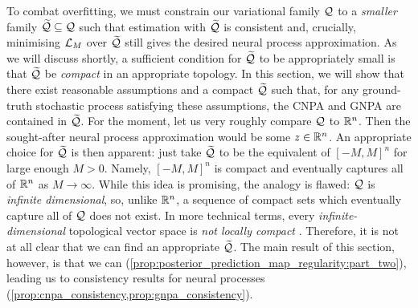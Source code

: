 \documentclass[12pt, twoside]{report}
\begin{document}
To combat overfitting, we must constrain our variational family $\mathcal{Q}$ to a \emph{smaller} family $\widetilde{\mathcal{Q}} \subseteq \mathcal{Q}$ such that estimation with $\widetilde{\mathcal{Q}}$ is consistent and, crucially, minimising $\mathcal{L}_M$ over $\widetilde{\mathcal{Q}}$ still gives the desired neural process approximation.
As we will discuss shortly, a sufficient condition for $\widetilde{\mathcal{Q}}$ to be appropriately small is that $\widetilde{\mathcal{Q}}$ be \emph{compact} in an appropriate topology.
In this section, we will show that there exist reasonable assumptions and a compact $\widetilde{\mathcal{Q}}$ such that, for any ground-truth stochastic process satisfying these assumptions, the CNPA and GNPA are contained in $\widetilde{\mathcal{Q}}$.
For the moment, let us very roughly compare $\mathcal{Q}$ to $\mathbb{R}^n$. 
Then the sought-after neural process approximation would be some $z \in \mathbb{R}^n$.
An appropriate choice for $\widetilde{\mathcal{Q}}$ is then apparent:
just take $\widetilde{\mathcal{Q}}$ to be the equivalent of $[-M, M]^n$ for large enough $M > 0$.
Namely, $[-M, M]^n$ is compact and eventually captures all of $\mathbb{R}^n$ as $M \to \infty$.
While this idea is promising, the analogy is flawed:
$\mathcal{Q}$ is \emph{infinite dimensional}, so, unlike $\mathbb{R}^n$, a sequence of compact sets which eventually capture all of $\mathcal{Q}$ does not exist. 
In more technical terms, every \emph{infinite-dimensional} topological vector space is \emph{not locally compact} \parencite[Theorem 1.22;][]{Rudin:1991:Functional_Analysis}.
Therefore, it is not at all clear that we can find an appropriate $\widetilde{\mathcal{Q}}$.
The main result of this section, however, is that we can (\cref{prop:posterior_prediction_map_regularity:part_two}),
leading us to consistency results for neural processes (\cref{prop:cnpa_consistency,prop:gnpa_consistency}).

\end{document}
